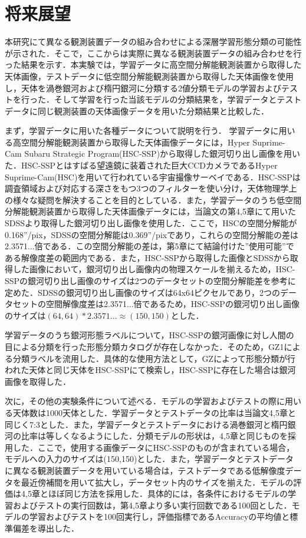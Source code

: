 \documentclass[a4j, 11pt]{jreport}
\begin{document}
\section{将来展望}
本研究にて異なる観測装置データの組み合わせによる深層学習形態分類の可能性が示された．そこで，ここからは実際に異なる観測装置データの組み合わせを行った結果を示す．本実験では，学習データに高空間分解能観測装置から取得した天体画像，テストデータに低空間分解能観測装置から取得した天体画像を使用し，天体を渦巻銀河および楕円銀河に分類する2値分類モデルの学習およびテストを行った．そして学習を行った当該モデルの分類結果を，学習データとテストデータに同じ観測装置の天体画像データを用いた分類結果と比較した．

まず，学習データに用いた各種データについて説明を行う．
学習データに用いる高空間分解能観測装置から取得した天体画像データには，Hyper Suprime-Cam Subaru Strategic Program(HSC-SSP)\cite{Tampo2020}から取得した銀河切り出し画像を用いた．HSC-SSPとはすばる望遠鏡に装着された巨大CCDカメラであるHyper Suprime-Cam(HSC)を用いて行われている宇宙撮像サーベイである．HSC-SSPは調査領域および対応する深さをもつ3つのフィルターを使い分け，天体物理学上の様々な疑問を解決することを目的としている．また，学習データのうち低空間分解能観測装置から取得した天体画像データには，当論文の第4,5章にて用いたSDSSより取得した銀河切り出し画像を使用した．ここで，HSCの空間分解能が0.168''/pix，SDSSの空間分解能は0.369''/pixであり，これらの空間分解能の差は2.3571...倍である．この空間分解能の差は，第5章にて結論付けた''使用可能''である解像度差の範囲内である．また，HSC-SSPから取得した画像とSDSSから取得した画像において，銀河切り出し画像内の物理スケールを揃えるため，HSC-SSPの銀河切り出し画像のサイズは2つのデータセットの空間分解能差を参考に定めた．SDSSの銀河切り出し画像のサイズは64x64ピクセルであり，2つのデータセットの空間解像度差は2.3571...倍であるため，HSC-SSPの銀河切り出し画像のサイズは$(64,64) * 2.3571... \approx (150,150)$とした．

学習データのうち銀河形態ラベルについて，HSC-SSPの銀河画像に対し人間の目による分類を行った形態分類カタログが存在しなかった．そのため，GZ1による分類ラベルを流用した．具体的な使用方法として，GZによって形態分類が行われた天体と同じ天体をHSC-SSPにて検索し，HSC-SSPに存在した場合は銀河画像を取得した．

次に，その他の実験条件について述べる．モデルの学習およびテストの際に用いる天体数は1000天体とした．学習データとテストデータの比率は当論文4,5章と同じく7:3とした．また，学習データとテストデータにおける渦巻銀河と楕円銀河の比率は等しくなるようにした．分類モデルの形状は，4,5章と同じものを採用した．ここで，使用する画像データにHSC-SSPのものが含まれている場合，モデルへの入力のサイズは(150,150)とした．また，学習データとテストデータに異なる観測装置データを用いている場合は，テストデータである低解像度データを最近傍補間を用いて拡大し，データセット内のサイズを揃えた．モデルの評価は4,5章とほぼ同じ方法を採用した．具体的には，各条件におけるモデルの学習およびテストの実行回数は，第4,5章より多い実行回数である100回とした．モデルの学習およびテストを100回実行し，評価指標であるAccuracyの平均値と標準偏差を導出した．
\end{document}

